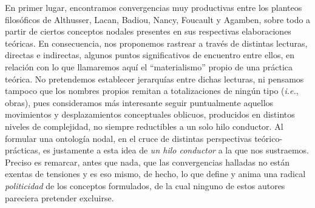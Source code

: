 En primer lugar, encontramos convergencias muy productivas entre los planteos filosóficos de Althusser, Lacan, Badiou, Nancy, Foucault y Agamben, sobre todo a partir de ciertos conceptos nodales presentes en sus respectivas elaboraciones teóricas. En consecuencia, nos proponemos rastrear a través de distintas lecturas, directas e indirectas, algunos puntos significativos de encuentro entre ellos, en relación con lo que llamaremos aquí el \enquote{materialismo} propio de una práctica teórica. No pretendemos establecer jerarquías entre dichas lecturas, ni pensamos tampoco que los nombres propios remitan a totalizaciones de ningún tipo (\emph{i.e.}, obras), pues consideramos más interesante seguir puntualmente aquellos movimientos y desplazamientos conceptuales oblicuos, producidos en distintos niveles de complejidad, no siempre reductibles a un solo hilo conductor. Al formular una ontología nodal, en el cruce de distintas perspectivas teórico-prácticas, es justamente a esta idea de \emph{un hilo conductor} a la que nos sustraemos. Preciso es remarcar, antes que nada, que las convergencias halladas no están exentas de tensiones y es eso mismo, de hecho, lo que define y anima una radical \emph{politicidad} de los conceptos formulados, de la cual ninguno de estos autores pareciera pretender excluirse.

